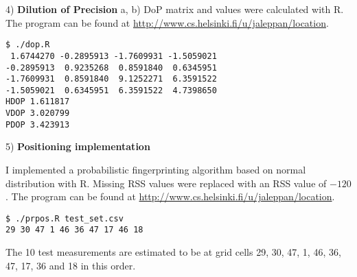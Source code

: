 \documentclass[a4paper,parskip=full]{scrartcl}
\begin{document}
4) \textbf{Dilution of Precision}
a, b) DoP matrix and values were calculated with R. The program can be found at
\url{http://www.cs.helsinki.fi/u/jaleppan/location}.
\begin{verbatim}
$ ./dop.R
 1.6744270 -0.2895913 -1.7609931 -1.5059021
-0.2895913  0.9235268  0.8591840  0.6345951
-1.7609931  0.8591840  9.1252271  6.3591522
-1.5059021  0.6345951  6.3591522  4.7398650
HDOP 1.611817
VDOP 3.020799
PDOP 3.423913
\end{verbatim}

5) \textbf{Positioning implementation}

I implemented a probabilistic fingerprinting algorithm based on normal
distribution with R. Missing RSS values were replaced with an RSS value of $-120$.
The program can be found at \url{http://www.cs.helsinki.fi/u/jaleppan/location}.
\begin{verbatim}
$ ./prpos.R test_set.csv 
29 30 47 1 46 36 47 17 46 18
\end{verbatim}
The 10 test measurements are estimated to be at grid cells 29, 30, 47, 1, 46,
36, 47, 17, 36 and 18 in this order.



\end{document}
